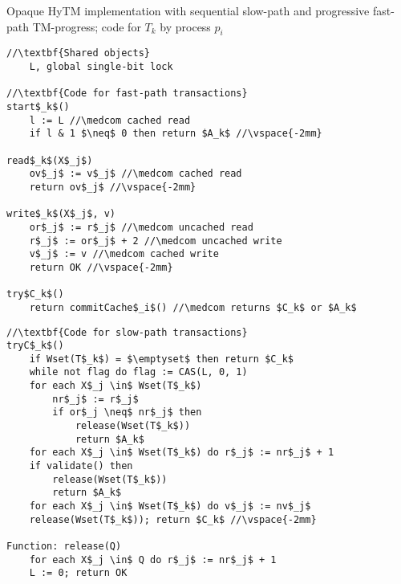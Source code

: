 \begin{algorithm*}[!ht]
\caption{Opaque HyTM implementation with sequential slow-path and progressive fast-path TM-progress; code for $T_k$ by process $p_i$}
\label{alg:inswrite2}
\vspace{-2mm}
\noindent\lstset{style=customc}
\begin{minipage}{0.49\textwidth}
\begin{lstlisting}[frame=none,firstnumber=1,mathescape=true]
//\textbf{Shared objects}
    L, global single-bit lock

//\textbf{Code for fast-path transactions}
start$_k$()
    l := L //\medcom cached read
    if l & 1 $\neq$ 0 then return $A_k$ //\vspace{-2mm}

read$_k$(X$_j$)
    ov$_j$ := v$_j$ //\medcom cached read
    return ov$_j$ //\vspace{-2mm}

write$_k$(X$_j$, v)
    or$_j$ := r$_j$ //\medcom uncached read
    r$_j$ := or$_j$ + 2 //\medcom uncached write
    v$_j$ := v //\medcom cached write
    return OK //\vspace{-2mm}

try$C_k$()
    return commitCache$_i$() //\medcom returns $C_k$ or $A_k$
\end{lstlisting}
\end{minipage}
\begin{minipage}{0.49\textwidth}
\begin{lstlisting}[frame=none,firstnumber=last,mathescape=true]
//\textbf{Code for slow-path transactions}
tryC$_k$()
    if Wset(T$_k$) = $\emptyset$ then return $C_k$
    while not flag do flag := CAS(L, 0, 1)
    for each X$_j \in$ Wset(T$_k$)
        nr$_j$ := r$_j$
        if or$_j \neq$ nr$_j$ then
            release(Wset(T$_k$))
            return $A_k$
    for each X$_j \in$ Wset(T$_k$) do r$_j$ := nr$_j$ + 1
    if validate() then
        release(Wset(T$_k$))
        return $A_k$
    for each X$_j \in$ Wset(T$_k$) do v$_j$ := nv$_j$
    release(Wset(T$_k$)); return $C_k$ //\vspace{-2mm}
    
Function: release(Q)
    for each X$_j \in$ Q do r$_j$ := nr$_j$ + 1
    L := 0; return OK
\end{lstlisting}
\end{minipage}
\vspace{-2mm}
\end{algorithm*}
